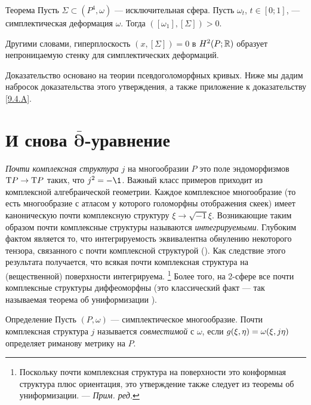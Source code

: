 \begin{thm}{Теорема}\label{10.1.A}
Пусть $\Sigma \subset (P^4, \omega)$ — исключительная сфера.
Пусть $\omega_t$, $t \in [0;1]$, — симплектическая деформация $\omega$.
Тогда $([\omega_1 ], [\Sigma]) > 0$.
\end{thm}

Другими словами, гиперплоскость $(x, [\Sigma]) = 0$ в $H^2 (P;\mathbb{R})$ образует непроницаемую стенку для симплектических деформаций.

Доказательство основано на теории псевдоголоморфных кривых.
Ниже мы дадим набросок доказательства этого утверждения, а также
приложение к доказательству \ref{9.4.A}. 

\section[\texorpdfstring{И снова $\bar\partial$-уравнение}{И снова ∂-уравнение}]{И снова $\bm{\bar\partial}$-уравнение}

\emph{Почти комплексная структура} $j$ на многообразии $P$ это поле
эндоморфизмов $\mathrm{T} P \to \mathrm{T} P$ таких, что $j^2 = -\1$. 
Важный класс примеров приходит из комплексной алгебраической геометрии.
Каждое комплексное многообразие (то есть многообразие с атласом у
которого голоморфны отображения скеек) имеет каноническую почти
комплексную структуру $\xi \to \sqrt{-1}\xi$. 
Возникающие таким образом почти комплексные структуры называются
\emph{интегрируемыми}. 
Глубоким фактом является то, что интегрируемость эквивалентна
обнулению некоторого тензора, связанного с почти комплексной
структурой (\cite{NN}). 
Как следствие этого результата получается, что всякая почти
комплексная структура на (вещественной) поверхности интегрируема.%
\footnote{Поскольку почти комплексная структура на поверхности это конформная структура плюс ориентация,
это утверждение также следует из теоремы об униформизации. — \textit{Прим. ред.}}
Более того, на 2-сфере все почти комплексные структуры диффеоморфны (это классический факт — так называемая теорема об униформизации \cite{AS}).

\begin{ex*}{Определение}
Пусть $(P, \omega)$ — симплектическое многообразие.
Почти комплексная структура $j$ называется \emph{совместимой} с $\omega$, если $g(\xi,
\eta) \z= \omega(\xi, j\eta)$ определяет риманову метрику на $P$. 
\end{ex*}


